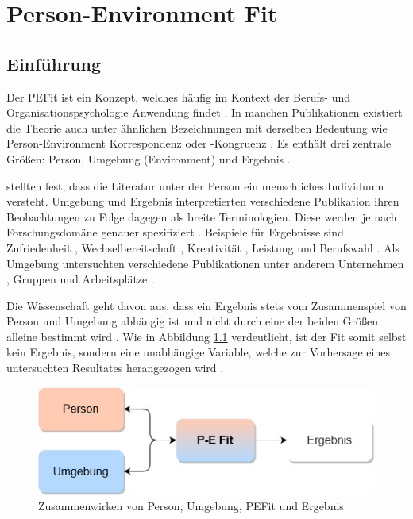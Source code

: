 \chapter{Person-Environment Fit}
\label{ch:personEnvironmentFit}

\section{Einführung}
\label{ch:personEnvironmentFit:einfuehrung}
Der \acf{PEFit} ist ein Konzept, welches häufig im Kontext der Berufs- und Organisationspsychologie Anwendung findet \cite[S. 2]{guan:2021}. In manchen Publikationen existiert die Theorie auch unter ähnlichen Bezeichnungen mit derselben Bedeutung wie Person-Environment Korrespondenz \cite[S. 1]{eggerth:2008} oder -Kongruenz \cite[S. 1]{muchinsky:1987}. Es enthält drei zentrale Größen: Person, Umgebung (Environment) und Ergebnis \cite[S. 2]{livingstone:1997}.

\textcite[S. 5]{edwards:2007} stellten fest, dass die Literatur unter der Person ein menschliches Individuum versteht. Umgebung und Ergebnis interpretierten verschiedene Publikation ihren Beobachtungen zu Folge dagegen als breite Terminologien. Diese werden je nach Forschungsdomäne genauer spezifiziert \cite[S. 1ff.]{edwards:2007}. Beispiele für Ergebnisse sind Zufriedenheit \cite[S. 1]{lashani:2021}, Wechselbereitschaft \cite[S. 1]{amarneh:2021}, Kreativität \cite[S. 1]{duan:2019}, Leistung \cite[S. 6ff.]{elfenbein:2007} und  Berufswahl \cite[S. 1]{cable:1996}. Als Umgebung untersuchten verschiedene Publikationen unter anderem Unternehmen \cite[S. 1]{kristof:1996}, Gruppen \cite[S. 1]{werbel:2001} und Arbeitsplätze \cite[S. 1]{lu:2014}.

Die Wissenschaft geht davon aus, dass ein Ergebnis stets vom Zusammenspiel von Person und Umgebung abhängig ist und nicht durch eine der beiden Größen alleine bestimmt wird \cite[S. 1f.]{muchinsky:1987}. Wie in Abbildung \ref{fig:personEnvironmentFit:einfuehrung:abb1} verdeutlicht, ist der Fit somit selbst kein Ergebnis, sondern eine unabhängige Variable, welche zur Vorhersage eines untersuchten Resultates herangezogen wird \cite[S. 11]{caplan:1993}\cite[S.5]{edwards:1991}\cite[S. 1]{edwards:2002}.

\begin{figure}[h]
	\centering
	\includegraphics[width=1\textwidth]{gfx/P-E Fit.jpg}
	\caption{Zusammenwirken von Person, Umgebung, \acs{PEFit} und Ergebnis}
	\label{fig:personEnvironmentFit:einfuehrung:abb1}
\end{figure}

